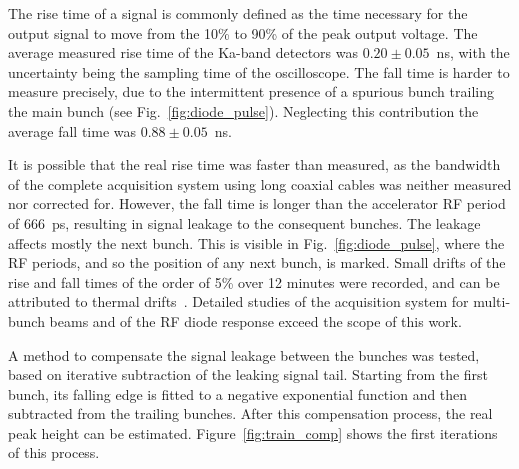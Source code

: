 The rise time of a signal is commonly defined as the time necessary for the output signal to move from the 10\% to 90\% of the peak output voltage. The average measured rise time of the Ka-band detectors was $0.20 \pm 0.05$~ns, with the uncertainty being the sampling time of the oscilloscope. The fall time is harder to measure precisely, due to the intermittent presence of a spurious bunch trailing the main bunch (see Fig.~\ref{fig:diode_pulse}). Neglecting this contribution the average fall time was $0.88 \pm 0.05$~ns.

It is possible that the real rise time was faster than measured, as the bandwidth of the complete acquisition system using long coaxial cables was neither measured nor corrected for. However, the fall time is longer than the accelerator RF period of 666~ps, resulting in signal leakage to the consequent bunches. The leakage affects mostly the next bunch. This is visible in Fig.~\ref{fig:diode_pulse}, where the RF periods, and so the position of any next bunch, is marked. Small drifts of the rise and fall times of the order of 5\% over 12 minutes were recorded, and can be attributed to thermal drifts~\cite{schottky_diodes_temp_extremes}. Detailed studies of the acquisition system for multi-bunch beams and of the RF diode response exceed the scope of this work.

A method to compensate the signal leakage between the bunches was tested, based on iterative subtraction of the leaking signal tail. Starting from the first bunch, its falling edge is fitted to a negative exponential function and then subtracted from the trailing bunches. After this compensation process, the real peak height can be estimated. Figure~\ref{fig:train_comp} shows the first iterations of this process. 




